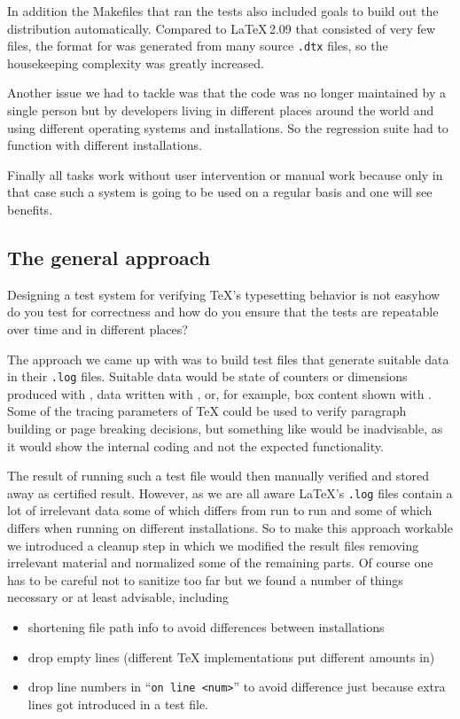 \documentclass[a4paper]{ltugboat}
\begin{document}
In addition the Makefiles that ran the tests also included goals to
build out the distribution automatically.  Compared to \LaTeX\,2.09
that consisted of very few files, the format for \LaTeXe{} was
generated from many source \texttt{.dtx} files, so the housekeeping
complexity was greatly increased.

Another issue we had to tackle was that the code was no longer
maintained by a single person but by developers living in different
places around the world and using different operating systems and
installations. So the regression suite had to function with different
installations.

Finally all tasks work without user intervention or manual work because
only in that case such a system is going to be used on a regular basis
and one will see benefits.

\subsection{The general approach}

Designing a test system for verifying \TeX's typesetting behavior is
not easy\Dash how do you test for correctness and how do you ensure
that the tests are repeatable over time and in different places?

The approach we came up with was to build test files that generate
suitable data in their \texttt{.log} files. Suitable data would be
state of counters or dimensions produced with , data
written with , or, for example, box content shown with
. Some of the tracing parameters of \TeX{} could be used to
verify paragraph building or page breaking decisions, but something
like  would be inadvisable, as it would show the
internal coding and not the expected functionality.

The result of running such a test file would then manually verified
and stored away as certified result. However, as we are all aware
\LaTeX's \texttt{.log} files contain a lot of irrelevant data some of
which differs from run to run and some of which differs when running
on different installations. So to make this approach workable we
introduced a cleanup step in which we modified the result files
removing irrelevant material and normalized some of the remaining
parts. Of course one has to be careful not to sanitize too far but we
found a number of things necessary or at least advisable, including
\begin{itemize}
\item  shortening file path info to avoid differences between
installations
\item drop empty lines (different \TeX{} implementations put
different amounts in)
\item drop line numbers in ``\texttt{on line <num>}'' to avoid difference
 just because extra lines got introduced in a test file.
\end{itemize}
\end{document}
